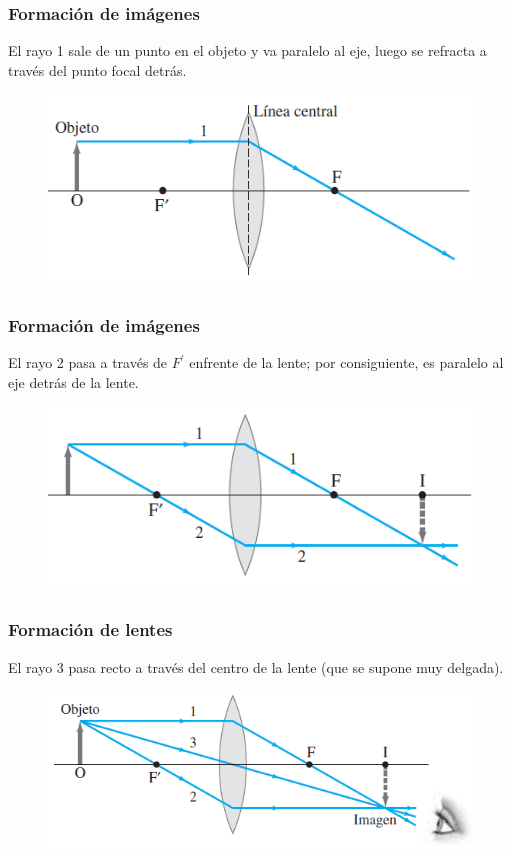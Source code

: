 \documentclass[14pt]{beamer}
\begin{document}
\begin{frame}
\frametitle{Formación de imágenes}
\vspace*{-1cm}
El rayo 1 sale de un punto en el objeto y va paralelo al eje, luego se refracta a través del punto focal detrás.
\begin{figure}
    \centering
    \includegraphics[scale=0.8]{Imagenes/Formacion_Imagen_01.png}
\end{figure}
\end{frame}
\begin{frame}
\frametitle{Formación de imágenes}
\vspace*{-1cm}
El rayo 2 pasa a través de $F^{\prime}$ enfrente de la lente; por consiguiente, es paralelo al eje detrás de la lente.
\begin{figure}
    \centering
    \includegraphics[scale=0.8]{Imagenes/Formacion_Imagen_02.png}
\end{figure}
\end{frame}
\begin{frame}
\frametitle{Formación de lentes}
\vspace*{-1cm}
El rayo 3 pasa recto a través del  centro de la lente (que se supone muy delgada).
\begin{figure}
    \centering
    \includegraphics[scale=0.8]{Imagenes/Formacion_Imagen_03.png}
\end{figure}
\end{frame}
\end{document}
